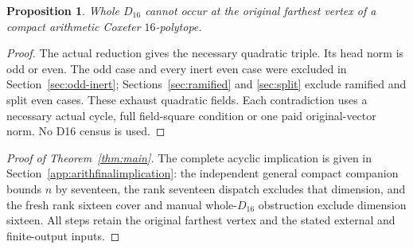 \documentclass[11pt]{article}
\newtheorem{proposition}[theorem]{Proposition}
\begin{document}
\begin{proposition}\label{prop:noD16}
Whole $D_{16}$ cannot occur at the original farthest vertex
of a compact arithmetic Coxeter $16$-polytope.
\end{proposition}
\begin{proof}
The actual reduction gives the necessary quadratic triple.
Its head norm is odd or even. The odd case and every inert even
case were excluded in Section~\ref{sec:odd-inert};
Sections~\ref{sec:ramified} and \ref{sec:split} exclude
ramified and split even cases. These exhaust quadratic fields.
Each contradiction uses a necessary actual cycle, full field-square
condition or one paid original-vector norm. No D16 census is used.
\end{proof}

\begin{proof}[Proof of Theorem~\ref{thm:main}]
The complete acyclic implication is given in
Section~\ref{app:arithfinalimplication}: the independent general compact
companion bounds $n$ by seventeen, the rank seventeen dispatch excludes that
dimension, and the fresh rank sixteen cover and manual whole-$D_{16}$
obstruction exclude dimension sixteen.
All steps retain the original farthest vertex and the stated external
and finite-output inputs.
\end{proof}
\end{document}
